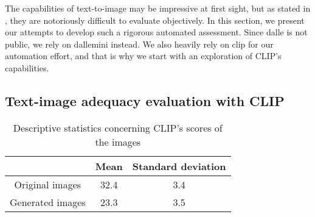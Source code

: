 \documentclass{article}
\begin{document}
\begin{multicols}{2}

The capabilities of text-to-image may be impressive at first sight, but as stated in \cite{probml-advanced}, they are notoriously difficult to evaluate objectively. In this section, we present our attempts to develop such a rigorous automated assessment. Since \gls{dalle} is not public, we rely on \gls{dallemini} instead. We also heavily rely on \gls{clip} for our automation effort, and that is why we start with an exploration of CLIP's capabilities.



\subsection{Text-image adequacy evaluation with CLIP}
    

\begin{table*}[]
    \centering
    \begin{tabular}{ |c|c|c| } 
    \hline
    & Mean & Standard deviation \\ 
    \hline
    Original images & 32.4 & 3.4 \\ 
    Generated images & 23.3 & 3.5 \\ 
    \hline
    \end{tabular}
    \caption{Descriptive statistics concerning CLIP's scores of the images}
    \label{tab:inq-clip}
\end{table*}


\end{multicols}
\end{document}

